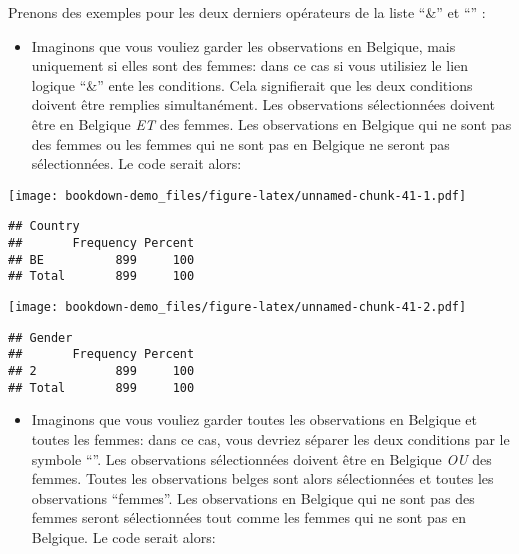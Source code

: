 \documentclass[
]{book}
\newenvironment{Shaded}{\begin{snugshade}}{\end{snugshade}}
\newcommand{\CommentTok}[1]{\textcolor[rgb]{0.56,0.35,0.01}{\textit{#1}}}
\newcommand{\DecValTok}[1]{\textcolor[rgb]{0.00,0.00,0.81}{#1}}
\newcommand{\FunctionTok}[1]{\textcolor[rgb]{0.00,0.00,0.00}{#1}}
\newcommand{\NormalTok}[1]{#1}
\newcommand{\OtherTok}[1]{\textcolor[rgb]{0.56,0.35,0.01}{#1}}
\newcommand{\SpecialCharTok}[1]{\textcolor[rgb]{0.00,0.00,0.00}{#1}}
\newcommand{\StringTok}[1]{\textcolor[rgb]{0.31,0.60,0.02}{#1}}
\providecommand{\tightlist}{%
  \setlength{\itemsep}{0pt}\setlength{\parskip}{0pt}}
\begin{document}
Prenons des exemples pour les deux derniers opérateurs de la liste ``\&'' et ``\textbar{}'' :

\begin{itemize}
\tightlist
\item
  Imaginons que vous vouliez garder les observations en Belgique, mais uniquement si elles sont des femmes: dans ce cas si vous utilisiez le lien logique ``\&'' ente les conditions. Cela signifierait que les deux conditions doivent être remplies simultanément. Les observations sélectionnées doivent être en Belgique \emph{ET} des femmes. Les observations en Belgique qui ne sont pas des femmes ou les femmes qui ne sont pas en Belgique ne seront pas sélectionnées. Le code serait alors:
\end{itemize}

\begin{Shaded}
\end{Shaded}

\texttt{[image: bookdown-demo\_files/figure-latex/unnamed-chunk-41-1.pdf]}

\begin{verbatim}
## Country 
##       Frequency Percent
## BE          899     100
## Total       899     100
\end{verbatim}

\begin{Shaded}
\end{Shaded}

\texttt{[image: bookdown-demo\_files/figure-latex/unnamed-chunk-41-2.pdf]}

\begin{verbatim}
## Gender 
##       Frequency Percent
## 2           899     100
## Total       899     100
\end{verbatim}

\begin{itemize}
\tightlist
\item
  Imaginons que vous vouliez garder toutes les observations en Belgique et toutes les femmes: dans ce cas, vous devriez séparer les deux conditions par le symbole ``\textbar{}''. Les observations sélectionnées doivent être en Belgique \emph{OU} des femmes. Toutes les observations belges sont alors sélectionnées et toutes les observations ``femmes''. Les observations en Belgique qui ne sont pas des femmes seront sélectionnées tout comme les femmes qui ne sont pas en Belgique. Le code serait alors:
\end{itemize}
\end{document}
